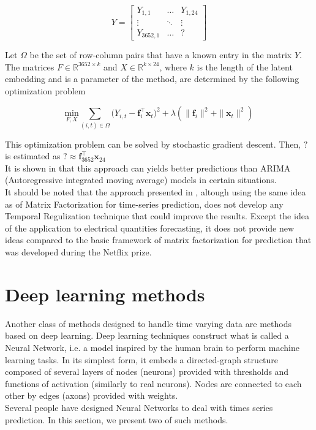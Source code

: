 \documentclass{article}
\begin{document}
$$Y = \begin{bmatrix} Y_{1,1} & \hdots & Y_{1,24} \\ \vdots & \ddots & \vdots \\ Y_{3652,1} & \hdots & ? \end{bmatrix}$$

Let $\Omega$ be the set of row-column pairs that have a known entry in the matrix $Y$. The matrices $F \in \mathbb{R}^{3652 \times k}$ and $X \in \mathbb{R}^{k \times 24}$, where $k$ is the length of the latent embedding and is a parameter of the method, are determined by the following optimization problem

$$\underset{F,X}{\text{min}} \sum_{(i,t) \in \Omega} \Big( Y_{i,t} - \mathbf{f}_i^{\top}\mathbf{x}_t \Big)^2 + \lambda (\|\mathbf{f}_i\|^2 + \|\mathbf{x}_t\|^2) $$

This optimization problem can be solved by stochastic gradient descent. Then, $?$ is estimated as $? \approx \mathbf{f}_{3652}^{\top}\mathbf{x}_{24}$ \\
It is shown in \cite{Elec} that this approach can yields better predictions than ARIMA (Autoregressive integrated moving average) models in certain situations. \\

It should be noted that the approach presented in \cite{Elec}, altough using the same idea as \cite{TRMF} of Matrix Factorization for time-series prediction, does not develop any Temporal Regulization technique that could improve the results. Except the idea of the application to electrical quantities forecasting, it does not provide new ideas compared to the basic framework of matrix factorization for prediction that was developed during the Netflix prize.

\section{Deep learning methods}
\label{dl}
Another class of methods designed to handle time varying data are methods based on deep learning.
Deep learning techniques construct what is called a Neural Network, i.e. a model inspired by the human brain to perform machine learning tasks. In its simplest form, it embeds a directed-graph structure composed of several layers of nodes (neurons) provided with thresholds and functions of activation (similarly to real neurons). Nodes are connected to each other by edges (axons) provided with weights. \\
Several people have designed Neural Networks to deal with times series prediction. In this section, we present two of such methods.
\end{document}
